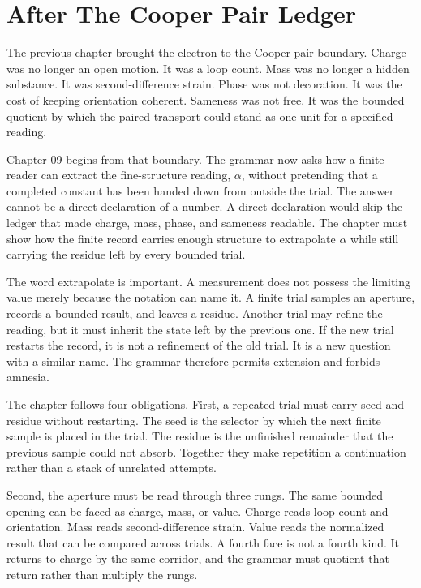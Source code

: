 \section{After The Cooper Pair Ledger}

The previous chapter brought the electron to the Cooper-pair boundary. Charge
was no longer an open motion. It was a loop count. Mass was no longer a hidden
substance. It was second-difference strain. Phase was not decoration. It was
the cost of keeping orientation coherent. Sameness was not free. It was the
bounded quotient by which the paired transport could stand as one unit for a
specified reading.

Chapter 09 begins from that boundary. The grammar now asks how a finite reader
can extract the fine-structure reading, \(\alpha\), without pretending that a
completed constant has been handed down from outside the trial. The answer
cannot be a direct declaration of a number. A direct declaration would skip the
ledger that made charge, mass, phase, and sameness readable. The chapter must
show how the finite record carries enough structure to extrapolate \(\alpha\)
while still carrying the residue left by every bounded trial.

The word extrapolate is important. A measurement does not possess the limiting
value merely because the notation can name it. A finite trial samples an
aperture, records a bounded result, and leaves a residue. Another trial may
refine the reading, but it must inherit the state left by the previous one.
If the new trial restarts the record, it is not a refinement of the old trial.
It is a new question with a similar name. The grammar therefore permits
extension and forbids amnesia.

The chapter follows four obligations. First, a repeated trial must carry seed
and residue without restarting. The seed is the selector by which the next
finite sample is placed in the trial. The residue is the unfinished remainder
that the previous sample could not absorb. Together they make repetition a
continuation rather than a stack of unrelated attempts.

Second, the aperture must be read through three rungs. The same bounded
opening can be faced as charge, mass, or value. Charge reads loop count and
orientation. Mass reads second-difference strain. Value reads the normalized
result that can be compared across trials. A fourth face is not a fourth kind.
It returns to charge by the same corridor, and the grammar must quotient that
return rather than multiply the rungs.

